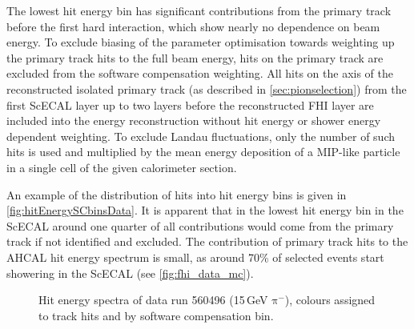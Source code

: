\documentclass[twoside,a4paper,12pt]{article}
\newcommand\piminus{\(\mathrm{\pi^-}\)}
\begin{document}
The lowest hit energy bin has significant contributions from the primary track before the first hard interaction, which show nearly no dependence on beam energy. To exclude biasing of the parameter optimisation towards weighting up the primary track hits to the full beam energy, hits on the primary track are excluded from the software compensation weighting. All hits on the axis of the reconstructed isolated primary track (as described in \autoref{sec:pionselection}) from the first ScECAL layer up to two layers before the reconstructed FHI layer are included into the energy reconstruction without hit energy or shower energy dependent weighting. To exclude Landau fluctuations, only the number of such hits is used and multiplied by the mean energy deposition of a MIP-like particle in a single cell of the given calorimeter section.

An example of the distribution of hits into hit energy bins is given in \autoref{fig:hitEnergySCbinsData}. It is apparent that in the lowest hit energy bin in the ScECAL around one quarter of all contributions would come from the primary track if not identified and excluded. The contribution of primary track hits to the AHCAL hit energy spectrum is small, as around 70\% of selected events start showering in the ScECAL (see \autoref{fig:fhi_data_mc}).

\begin{figure}[htbp]
	\hfill
	
	\caption{Hit energy spectra of data run 560496 (15\,GeV \piminus), colours assigned to track hits and by software compensation bin.}
	\label{fig:hitEnergySCbinsData}
\end{figure}
\end{document}
